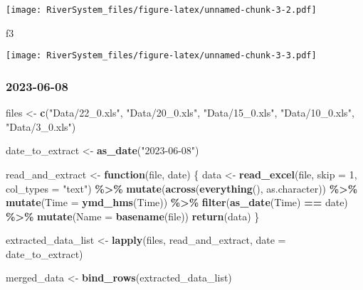 \documentclass[
]{article}
\newenvironment{Shaded}{\begin{snugshade}}{\end{snugshade}}
\newcommand{\AttributeTok}[1]{\textcolor[rgb]{0.13,0.29,0.53}{#1}}
\newcommand{\ControlFlowTok}[1]{\textcolor[rgb]{0.13,0.29,0.53}{\textbf{#1}}}
\newcommand{\DecValTok}[1]{\textcolor[rgb]{0.00,0.00,0.81}{#1}}
\newcommand{\FunctionTok}[1]{\textcolor[rgb]{0.13,0.29,0.53}{\textbf{#1}}}
\newcommand{\NormalTok}[1]{#1}
\newcommand{\OtherTok}[1]{\textcolor[rgb]{0.56,0.35,0.01}{#1}}
\newcommand{\SpecialCharTok}[1]{\textcolor[rgb]{0.81,0.36,0.00}{\textbf{#1}}}
\newcommand{\StringTok}[1]{\textcolor[rgb]{0.31,0.60,0.02}{#1}}
\begin{document}
\texttt{[image: RiverSystem\_files/figure-latex/unnamed-chunk-3-2.pdf]}

\begin{Shaded}
\begin{Highlighting}[]
\NormalTok{f3}
\end{Highlighting}
\end{Shaded}

\texttt{[image: RiverSystem\_files/figure-latex/unnamed-chunk-3-3.pdf]}

\subsubsection{2023-06-08}\label{section}

\begin{Shaded}
\begin{Highlighting}[]
\NormalTok{files }\OtherTok{\textless{}{-}} \FunctionTok{c}\NormalTok{(}\StringTok{"Data/22\_0.xls"}\NormalTok{, }\StringTok{"Data/20\_0.xls"}\NormalTok{, }\StringTok{"Data/15\_0.xls"}\NormalTok{, }\StringTok{"Data/10\_0.xls"}\NormalTok{, }\StringTok{"Data/3\_0.xls"}\NormalTok{)}


\NormalTok{date\_to\_extract }\OtherTok{\textless{}{-}} \FunctionTok{as\_date}\NormalTok{(}\StringTok{"2023{-}06{-}08"}\NormalTok{)}


\NormalTok{read\_and\_extract }\OtherTok{\textless{}{-}} \ControlFlowTok{function}\NormalTok{(file, date) \{}
\NormalTok{  data }\OtherTok{\textless{}{-}} \FunctionTok{read\_excel}\NormalTok{(file, }\AttributeTok{skip =} \DecValTok{1}\NormalTok{, }\AttributeTok{col\_types =} \StringTok{"text"}\NormalTok{) }\SpecialCharTok{\%\textgreater{}\%} 
    \FunctionTok{mutate}\NormalTok{(}\FunctionTok{across}\NormalTok{(}\FunctionTok{everything}\NormalTok{(), as.character)) }\SpecialCharTok{\%\textgreater{}\%}
    \FunctionTok{mutate}\NormalTok{(}\AttributeTok{Time =} \FunctionTok{ymd\_hms}\NormalTok{(Time)) }\SpecialCharTok{\%\textgreater{}\%}
    \FunctionTok{filter}\NormalTok{(}\FunctionTok{as\_date}\NormalTok{(Time) }\SpecialCharTok{==}\NormalTok{ date) }\SpecialCharTok{\%\textgreater{}\%}
    \FunctionTok{mutate}\NormalTok{(}\AttributeTok{Name =} \FunctionTok{basename}\NormalTok{(file))  }
  \FunctionTok{return}\NormalTok{(data)}
\NormalTok{\}}


\NormalTok{extracted\_data\_list }\OtherTok{\textless{}{-}} \FunctionTok{lapply}\NormalTok{(files, read\_and\_extract, }\AttributeTok{date =}\NormalTok{ date\_to\_extract)}


\NormalTok{merged\_data }\OtherTok{\textless{}{-}} \FunctionTok{bind\_rows}\NormalTok{(extracted\_data\_list)}



\end{Highlighting}
\end{Shaded}
\end{document}
